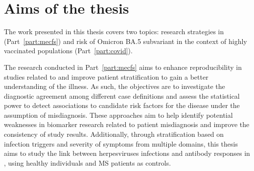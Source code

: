 


\clearpage
\section{Aims of the thesis}
\label{sec:aims-thesis}



The work presented in this thesis covers two topics: research strategies in \cfs (Part~\ref{part:mecfs}) and risk of \sars Omicron BA.5 subvariant in the context of highly vaccinated populations (Part~\ref{part:covid}).

The research conducted in Part~\ref{part:mecfs} aims to enhance reproducibility in studies related to \cfs and improve patient stratification to gain a better understanding of the illness.
As such, the objectives are to investigate the diagnostic agreement among different case definitions and assess the statistical power to detect associations to candidate risk factors for the disease under the assumption of misdiagnosis.
These approaches aim to help identify potential weaknesses in biomarker research related to patient misdiagnosis and improve the consistency of study results.
Additionally, through stratification based on infection triggers and severity of symptoms from multiple domains, this thesis aims to study the link between herpesviruses infections and antibody responses in \cfs, using healthy individuals and MS patients as controls.

